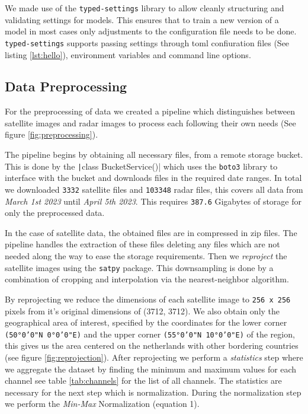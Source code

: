 We made use of the \texttt{typed-settings} library to allow cleanly structuring and validating settings for models.
This ensures that to train a new version of a model in most cases only adjustments to the configuration file needs to be done.
\texttt{typed-settings} supports passing settings through toml confiuration files (See listing \ref{lst:hello}), environment variables and command line options.



\subsection{Data Preprocessing}
For the preprocessing of data we created a pipeline which distinguishes between satellite images and radar images to process each following their own needs (See figure \ref{fig:preprocessing}).
\medskip

The pipeline begins by obtaining all necessary files, from a remote storage bucket.
This is done by the \texttt|class BucketService()| which uses the \texttt{boto3}
library to interface with the bucket and downloads files in the required date ranges. In total we downloaded \texttt{3332} satellite files and \texttt{103348} radar files, this covers
all data from \textit{March 1st 2023} until \textit{April 5th 2023}. This requires \texttt{387.6} Gigabytes of storage for only the preprocessed data.
\medskip

In the case of satellite data, the obtained files are in compressed in zip files. The pipeline handles the extraction of these files deleting any files which are not needed along the way to ease the storage requirements.
Then we \textit{reproject} the satellite images using the \texttt{satpy} package. This downsampling is done by a combination of cropping and interpolation via the nearest-neighbor algorithm.
\medskip

By reprojecting we reduce the dimensions of each satellite image to \texttt{256 x 256} pixels from it's original dimensions of (3712, 3712).
 We also obtain only the geographical area of interest, specified by the coordinates for the lower corner \texttt{(50°0'0"N 0°0'0"E)} and the upper corner \texttt{(55°0'0"N 10°0'0"E)} of the region, this gives us
the area centered on the netherlands with other bordering countries (see figure \ref{fig:reprojection}).
After reprojecting we perform a \textit{statistics} step where we aggregate the dataset by finding the minimum and maximum values for each channel see table \ref{tab:channels} for the list of all channels.
The statistics are necessary for the next step which is normalization. During the normalization step we perform the \textit{Min-Max} Normalization (equation 1).

